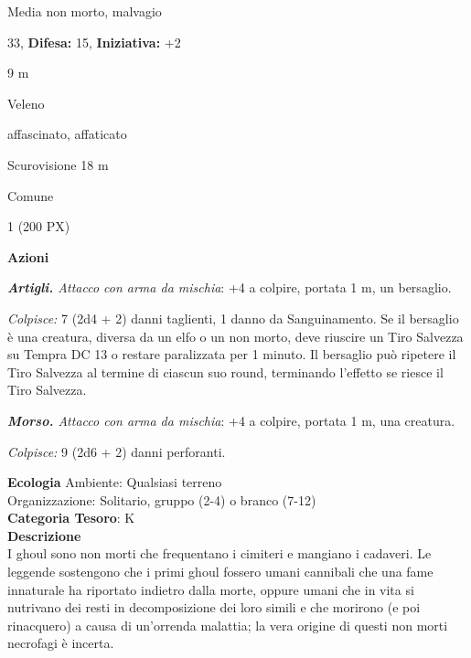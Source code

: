 \begin{multicols}{2}
{
\noindent
\begin{description}[noitemsep, topsep=0pt, parsep=0pt, partopsep=0pt, leftmargin=0cm, labelwidth=2.2cm]
	\item[\textbf{Taglia/Tipo:}] Media non morto, malvagio
	\item[\textbf{Caratt.:}] 
	\item[\textbf{Punti Ferita:}] 33,  \textbf{Difesa:} 15,  \textbf{Iniziativa:} +2
	\item[\textbf{Movimento:}] 9 m
	\item[\textbf{Tiri Salvez.:}] 
	\item[\textbf{Imm. Danni:}] Veleno
	\item[\textbf{Immunità:}] affascinato, affaticato
	\item[\textbf{Sensi:}] Scurovisione 18 m
	\item[\textbf{Linguaggi:}] Comune
	\item[\textbf{Sfida:}] 1 (200 PX)\smallskip
\end{description}

\textbf{Azioni}

\emph{\textbf{Artigli.} Attacco con arma da mischia}: +4 a colpire, portata 1 m, un bersaglio.

\emph{Colpisce:} 7 (2d4 + 2) danni taglienti, 1 danno da Sanguinamento. Se il bersaglio è una creatura, diversa da un elfo o un non morto, deve riuscire un Tiro Salvezza su Tempra DC 13 o restare paralizzata per 1 minuto. Il bersaglio può ripetere il Tiro Salvezza al termine di ciascun suo round, terminando l'effetto se riesce il Tiro Salvezza.

\emph{\textbf{Morso.} Attacco con arma da mischia}: +4 a colpire, portata 1 m, una creatura.

\emph{Colpisce:} 9 (2d6 + 2) danni perforanti.

\textbf{Ecologia}
Ambiente: Qualsiasi terreno\\
Organizzazione: Solitario, gruppo (2-4) o branco (7-12)\\
\textbf{Categoria Tesoro}: K\\
\textbf{Descrizione}\\
I ghoul sono non morti che frequentano i cimiteri e mangiano i cadaveri. Le leggende sostengono che i primi ghoul fossero umani cannibali che una fame innaturale ha riportato indietro dalla morte, oppure umani che in vita si nutrivano dei resti in decomposizione dei loro simili e che morirono (e poi rinacquero) a causa di un'orrenda malattia; la vera origine di questi non morti necrofagi è incerta.

}
\end{multicols}

